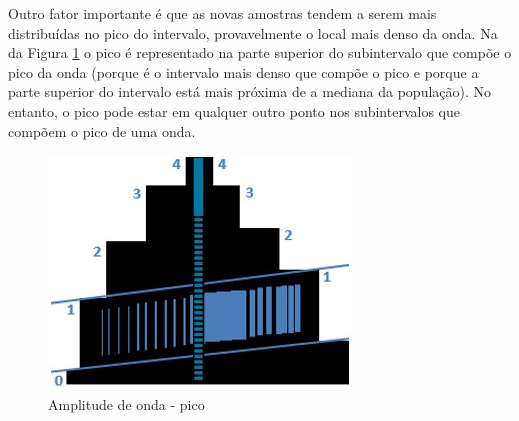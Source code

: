 Outro fator importante é que as novas amostras tendem a serem mais distribuídas no pico do intervalo, provavelmente o local mais denso da onda. Na da Figura \ref{fig:consciousness_space_amplitude_growth} o pico é representado na parte superior do subintervalo que compõe o pico da onda (porque é o intervalo mais denso que compõe o pico e porque a parte superior do intervalo está mais próxima de a mediana da população). No entanto, o pico pode estar em qualquer outro ponto nos subintervalos que compõem o pico de uma onda.
	\begin{figure}[H]
	\caption{Amplitude de onda - pico}
	\label{fig:consciousness_space_amplitude_growth}
	\centering
	\includegraphics[scale=.6]{sections/images/consciousness_space_amplitude_growth.jpg}
	\end{figure}

